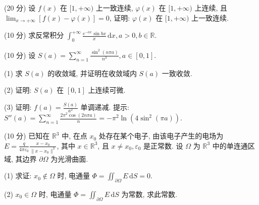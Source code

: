 (20 分) 设 $f(x)$ 在 $[1, +\infty)$ 上一致连续, $\varphi(x)$ 在 $[1, +\infty)$ 上连续, 且 $\lim_{x \to +\infty} [f(x) - \varphi(x)] = 0$, 证明: $\varphi(x)$ 在 $[1, +\infty)$ 上一致连续.\par
\par{}
(10 分) 求反常积分 $\int_0^{+\infty} \frac{e^{-ax} \sin bx}{x} \, \mathrm{d}x, a > 0, b \in \mathbb{R}$.\par
\par{}
(10 分) 设 $S(a) = \sum_{n=1}^{\infty} \frac{\sin^2(n\pi a)}{n^3}, a \in [0,1]$.\par
(1) 求 $S(a)$ 的收敛域, 并证明在收敛域内 $S(a)$ 一致收敛.\par
(2) 证明: $S(a)$ 在 $[0,1]$ 上连续可微.\par
(3) 证明: $f(a) = \frac{S(a)}{a^2}$ 单调递减. 提示: $S''(a) = \sum_{n=1}^{\infty} \frac{2\pi^2 \cos(2n\pi a)}{n} = -\pi^2 \ln(4\sin^2(\pi a)).$\par
\par{}
(10 分) 已知在 $\mathbb{R}^3$ 中, 在点 $x_0$ 处存在某个电子, 由该电子产生的电场为 $E = \frac{q}{4\pi\varepsilon_0}\frac{x - x_0}{\|x - x_0\|^3}$, 其中 $x \in \mathbb{R}^3$, 且 $x \neq x_0, \varepsilon_0$ 是正常数. 设 $\Omega$ 为 $\mathbb{R}^3$ 中的单连通区域, 其边界 $\partial \Omega$ 为光滑曲面.\par
(1) 求证: $x_0 \notin \Omega$ 时, 电通量 $\Phi = \iint_{\partial \Omega} E \, \mathrm{d}S = 0$.\par
(2) $x_0 \in \Omega$ 时, 电通量 $\Phi = \iint_{\partial \Omega} E \, \mathrm{d}S$ 为常数, 求此常数.\par
